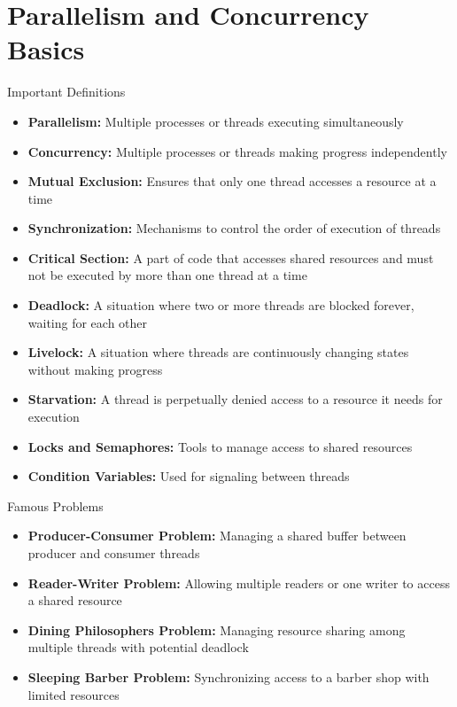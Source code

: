 \section{Parallelism and Concurrency Basics}

\begin{definition}{Important Definitions}
    \begin{itemize}
        \item \textbf{Parallelism:} Multiple processes or threads executing simultaneously
        \item \textbf{Concurrency:} Multiple processes or threads making progress independently
        \item \textbf{Mutual Exclusion:} Ensures that only one thread accesses a resource at a time
        \item \textbf{Synchronization:} Mechanisms to control the order of execution of threads
        \item \textbf{Critical Section:} A part of code that accesses shared resources and must not be executed by more than one thread at a time
        \item \textbf{Deadlock:} A situation where two or more threads are blocked forever, waiting for each other
        \item \textbf{Livelock:} A situation where threads are continuously changing states without making progress
        \item \textbf{Starvation:} A thread is perpetually denied access to a resource it needs for execution
        \item \textbf{Locks and Semaphores:} Tools to manage access to shared resources
        \item \textbf{Condition Variables:} Used for signaling between threads
    \end{itemize}
\end{definition}

\begin{concept}{Famous Problems}
    \begin{itemize}
        \item \textbf{Producer-Consumer Problem:} Managing a shared buffer between producer and consumer threads
        \item \textbf{Reader-Writer Problem:} Allowing multiple readers or one writer to access a shared resource
        \item \textbf{Dining Philosophers Problem:} Managing resource sharing among multiple threads with potential deadlock
        \item \textbf{Sleeping Barber Problem:} Synchronizing access to a barber shop with limited resources
    \end{itemize}
\end{concept}


